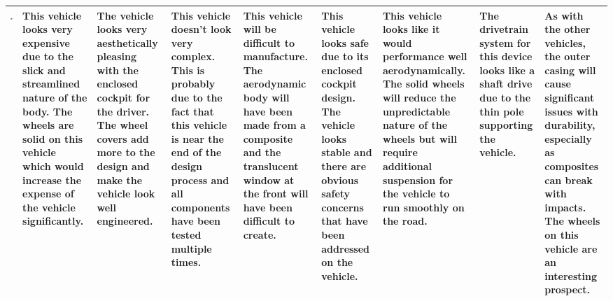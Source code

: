\begin{table}[p]
\begin{tabular}{|m{5cm}|m{\x}|m{\x}|m{\x}|m{\x}|m{\x}|m{\x}|m{\x}|m{\x}|}
      \includegraphics[width=\linewidth]{images/placeholder.jpg}
      &
      This vehicle looks very expensive due to the slick and streamlined nature of the body. The wheels are solid on this vehicle which would increase the expense of the vehicle significantly.
      &  
      The vehicle looks very aesthetically pleasing with the enclosed cockpit for the driver. The wheel covers add more to the design and make the vehicle look well engineered. 
      &  
      This vehicle doesn't look very complex. This is probably due to the fact that this vehicle is near the end of the design process and all components have been tested multiple times. 
      &  
      This vehicle will be difficult to manufacture. The aerodynamic body will have been made from a composite and the translucent window at the front will have been difficult to create. 
      &  
      This vehicle looks safe due to its enclosed cockpit design. The vehicle looks stable and there are obvious safety concerns that have been addressed on the vehicle. 
      &  
      This vehicle looks like it would performance well aerodynamically. The solid wheels will reduce the unpredictable nature of the wheels but will require additional suspension for the vehicle to run smoothly on the road. 
      &  
      The drivetrain system for this device looks like a shaft drive due to the thin pole supporting the vehicle. 
      & 
      As with the other vehicles, the outer casing will cause significant issues with durability, especially as composites can break with impacts. The wheels on this vehicle are an interesting prospect. 
      \\ \hline
      

\end{tabular}
\end{table}
